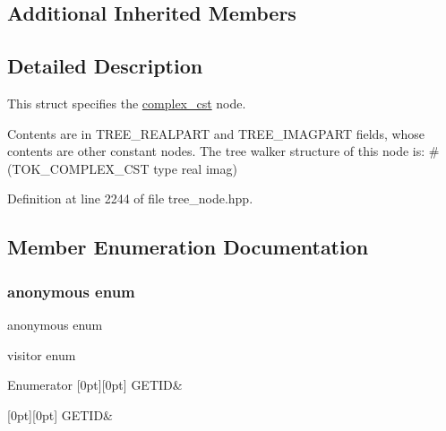 \subsection*{Additional Inherited Members}


\subsection{Detailed Description}
This struct specifies the \hyperlink{structcomplex__cst}{complex\+\_\+cst} node. 

Contents are in T\+R\+E\+E\+\_\+\+R\+E\+A\+L\+P\+A\+RT and T\+R\+E\+E\+\_\+\+I\+M\+A\+G\+P\+A\+RT fields, whose contents are other constant nodes. The tree walker structure of this node is\+: \#(T\+O\+K\+\_\+\+C\+O\+M\+P\+L\+E\+X\+\_\+\+C\+ST type real imag) 

Definition at line 2244 of file tree\+\_\+node.\+hpp.



\subsection{Member Enumeration Documentation}
\mbox{\label{structcomplex__cst_a48f51342ee832a5586de6b8513d9b982}} 
\subsubsection{\texorpdfstring{anonymous enum}{anonymous enum}}
{\footnotesize\ttfamily anonymous enum}



visitor enum 

\begin{DoxyEnumFields}{Enumerator}
[0pt][0pt]{}\mbox{\label{structcomplex__cst_a48f51342ee832a5586de6b8513d9b982a2c95f5d2e4431690f729294d5a050b98}} 
G\+E\+T\+ID&\\
\hline

[0pt][0pt]{}\mbox{\label{structcomplex__cst_a48f51342ee832a5586de6b8513d9b982a2c95f5d2e4431690f729294d5a050b98}} 
G\+E\+T\+ID&\\
\hline

\end{DoxyEnumFields}


